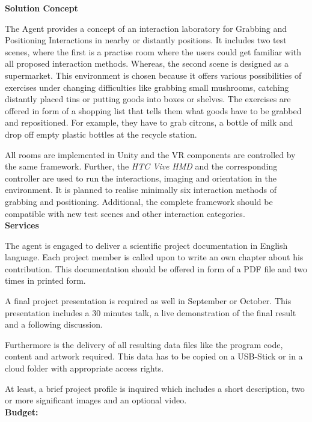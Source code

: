 \documentclass[a4paper, 12pt]{article}
\begin{document}
\textbf{Solution Concept}
 
 The Agent provides a concept of an interaction laboratory for Grabbing and Positioning Interactions in nearby or distantly positions. It includes two test scenes, where the first is a practise room where the users could get familiar with all proposed interaction methods. Whereas, the second scene is designed as a supermarket. This environment is chosen because it offers various possibilities of exercises under changing difficulties like grabbing small mushrooms, catching distantly placed tins or putting goods into boxes or shelves. The exercises are offered in form of a shopping list that tells them what goods have to be grabbed and repositioned. For example, they have to grab citrons, a bottle of milk and drop off empty plastic bottles at the recycle station.
 
 All rooms are implemented in Unity and the VR components are controlled by the same framework. Further, the \textit{HTC Vive HMD} and the corresponding controller are used to run the interactions, imaging and orientation in the environment. It is planned to realise minimally six interaction methods of grabbing and positioning. Additional, the complete framework should be compatible with new test scenes and other interaction categories.  \\

 
\textbf{Services}

The agent is engaged to deliver a scientific project documentation in English language. Each project member is called upon to write an own chapter about his contribution. This documentation should be offered in form of a PDF file and two times in printed form. 

A final project presentation is required as well in September or October. This presentation includes a 30 minutes talk, a live demonstration of the final result and a following discussion.

Furthermore is the delivery of all resulting data files like the program code, content and artwork required. This data has to be copied on a USB-Stick or in a cloud folder with appropriate access rights.

At least, a brief project profile is inquired which includes a short description, two or more significant images and an optional video.\\


\textbf{Budget:}\\
\end{document}
